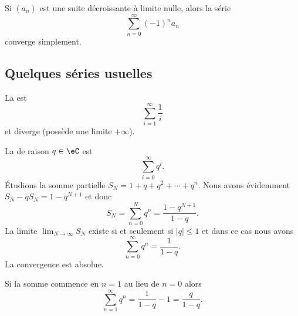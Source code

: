 \begin{corollary}       \label{CoreMjIfw}
    Si \( (a_n)\) est une suite décroissante à limite nulle, alors la série
  \begin{equation}
    \sum_{n=0}^\infty {(-1)}^n a_n
  \end{equation}
  converge simplement.
\end{corollary}

\subsection{Quelques séries usuelles}
\label{SUBSECooDTYHooZjXXJf}

\begin{example}
    La  est
    \begin{equation}
        \sum_{i=1}^\infty \frac1i
    \end{equation}
    et diverge (possède une limite $+\infty$).
\end{example}

\begin{example} \label{ExZMhWtJS}
    La  de raison $q \in \eC$ est
    \begin{equation}    \label{EqZQTGooIWEFxL}
        \sum_{i=0}^\infty q^i.
    \end{equation}
    Étudions la somme partielle \( S_N=1+q+q^2+\cdots +q^{n}\). Nous avons évidemment $S_N-qS_N=1-q^{N+1}$ et donc
    \begin{equation}    \label{EqASYTiCK}
        S_N=\sum_{n=0}^Nq^n=\frac{ 1-q^{N+1} }{ 1-q }.
    \end{equation}
    La limite \( \lim_{N\to \infty} S_N\) existe si et seulement si \( | q |\leq 1\) et dans ce cas nous avons
    \begin{equation}    \label{EqRGkBhrX}
        \sum_{n=0}^{\infty}q^n=\frac{ 1 }{ 1-q }.
    \end{equation}
    La convergence est absolue.

    Si la somme commence en \( n=1\) au lieu de \( n=0\) alors
    \begin{equation}        \label{EqPZOWooMdSRvY}
        \sum_{n=1}^{\infty}q^n=\frac{1}{ 1-q }-1=\frac{ q }{ 1-q }.
    \end{equation}
\end{example}

